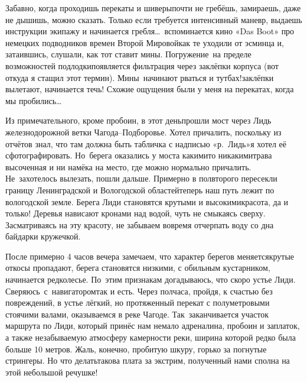 Забавно, когда проходишь перекаты и шиверы\mdash почти не гребёшь, замираешь, даже не дышишь, можно сказать. Только если требуется интенсивный маневр, выдаешь инструкции экипажу и начинается гребля\ldots~вспоминается кино «Das Boot» про немецких подводников времен Второй Мировой\mdash как те уходили от эсминца и, затаившись, слушали, как тот ставит мины. Погружение~на пределе возможностей подлодки\mdash появляется фильтрация через заклёпки корпуса (вот откуда я стащил этот термин). Мины~начинают рваться и тут\mdash бах!\mdash заклёпки вылетают, начинается течь! Схожие ощущения были у меня на перекатах, когда мы пробились\ldots~

Из примечательного, кроме пробоин, в этот день\mdash прошли мост через Лидь железнодорожной ветки Чагода\nobreakdash--Подборовье. Хотел причалить, поскольку из отчётов знал, что там должна быть табличка с надписью «р.~Лидь»\mdash я хотел её сфотографировать. Но~берега оказались у моста какими\sdash то никакими\mdash трава высоченная и ни намёка на место, где можно нормально причалить. Не~захотелось вылезать, пошли дальше. Примерно в полвторого пересекли границу Ленинградской и Вологодской областей\mdash теперь наш путь лежит по вологодской земле. Берега Лиди становятся крутыми и высокими\mdash красота, да и только! Деревья нависают кронами над водой, чуть не смыкаясь сверху. Засматриваясь на эту красоту, не забываем вовремя отчерпать воду со дна байдарки кружечкой.

После примерно 4 часов вечера замечаем, что характер берегов меняется\mdash крутые откосы пропадают, берега становятся низкими, с обильным кустарником, начинается редколесье. По~этим признакам догадываюсь, что скоро устье Лиди. Сверяюсь~с~навигатором\mdash так и есть. Через полчаса, пройдя, к счастью без повреждений, в устье лёгкий, но протяженный перекат с полуметровыми стоячими валами, оказываемся в реке Чагоде. Так~заканчивается участок маршрута по Лиди, который принёс нам немало адреналина, пробоин и заплаток, а также незабываемую атмосферу камерности реки, ширина которой редко была больше 10 метров. Жаль, конечно, пробитую шкуру, горько за погнутые стрингеры. Но что делать\mdash такова плата за экстрим, полученный нами сполна на этой небольшой речушке! 


